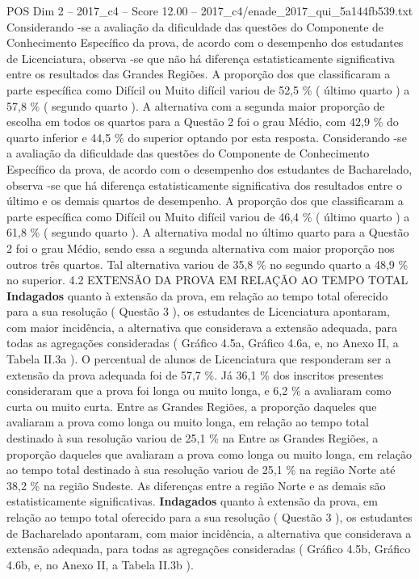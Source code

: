 \begin{textsample}{POS Dim 2 – 2017\_c4 – Score 12.00 – 2017\_c4/enade\_2017\_qui\_5a144fb539.txt}
Considerando -se a avaliação da dificuldade das questões do Componente de Conhecimento Específico da prova, de acordo com o desempenho dos estudantes de Licenciatura, observa -se que não há diferença estatisticamente significativa entre os resultados das Grandes Regiões.
A proporção dos que classificaram a parte específica como Difícil ou Muito difícil variou de 52,5 \% ( último quarto ) a 57,8 \% ( segundo quarto ).
A alternativa com a segunda maior proporção de escolha em todos os quartos para a Questão 2 foi o grau Médio, com 42,9 \% do quarto inferior e 44,5 \% do superior optando por esta resposta.
Considerando -se a avaliação da dificuldade das questões do Componente de Conhecimento Específico da prova, de acordo com o desempenho dos estudantes de Bacharelado, observa -se que há diferença estatisticamente significativa dos resultados entre o último e os demais quartos de desempenho.
A proporção dos que classificaram a parte específica como Difícil ou Muito difícil variou de 46,4 \% ( último quarto ) a 61,8 \% ( segundo quarto ).
A alternativa modal no último quarto para a Questão 2 foi o grau Médio, sendo essa a segunda alternativa com maior proporção nos outros três quartos.
Tal alternativa variou de 35,8 \% no segundo quarto a 48,9 \% no superior. 4.2 EXTENSÃO DA PROVA EM RELAÇÃO AO TEMPO TOTAL \textbf{Indagados} quanto à extensão da prova, em relação ao tempo total oferecido para a sua resolução ( Questão 3 ), os estudantes de Licenciatura apontaram, com maior incidência, a alternativa que considerava a extensão adequada, para todas as agregações consideradas ( Gráfico 4.5a, Gráfico 4.6a, e, no Anexo II, a Tabela II.3a ).
O percentual de alunos de Licenciatura que responderam ser a extensão da prova adequada foi de 57,7 \%.
Já 36,1 \% dos inscritos presentes consideraram que a prova foi longa ou muito longa, e 6,2 \% a avaliaram como curta ou muito curta.
Entre as Grandes Regiões, a proporção daqueles que avaliaram a prova como longa ou muito longa, em relação ao tempo total destinado à sua resolução variou de 25,1 \% na Entre as Grandes Regiões, a proporção daqueles que avaliaram a prova como longa ou muito longa, em relação ao tempo total destinado à sua resolução variou de 25,1 \% na região Norte até 38,2 \% na região Sudeste.
As diferenças entre a região Norte e as demais são estatisticamente significativas. \textbf{Indagados} quanto à extensão da prova, em relação ao tempo total oferecido para a sua resolução ( Questão 3 ), os estudantes de Bacharelado apontaram, com maior incidência, a alternativa que considerava a extensão adequada, para todas as agregações consideradas ( Gráfico 4.5b, Gráfico 4.6b, e, no Anexo II, a Tabela II.3b ).

\end{textsample}
